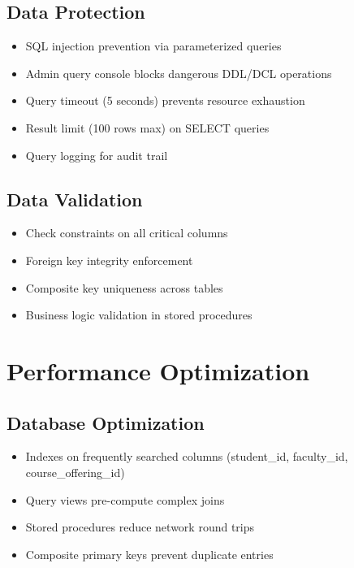 \documentclass[12pt]{article}
\begin{document}
\subsection{Data Protection}

\begin{itemize}
    \item SQL injection prevention via parameterized queries
    \item Admin query console blocks dangerous DDL/DCL operations
    \item Query timeout (5 seconds) prevents resource exhaustion
    \item Result limit (100 rows max) on SELECT queries
    \item Query logging for audit trail
\end{itemize}

\subsection{Data Validation}

\begin{itemize}
    \item Check constraints on all critical columns
    \item Foreign key integrity enforcement
    \item Composite key uniqueness across tables
    \item Business logic validation in stored procedures
\end{itemize}

\newpage

\section{Performance Optimization}

\subsection{Database Optimization}

\begin{itemize}
    \item Indexes on frequently searched columns (student\_id, faculty\_id, course\_offering\_id)
    \item Query views pre-compute complex joins
    \item Stored procedures reduce network round trips
    \item Composite primary keys prevent duplicate entries
\end{itemize}
\end{document}
